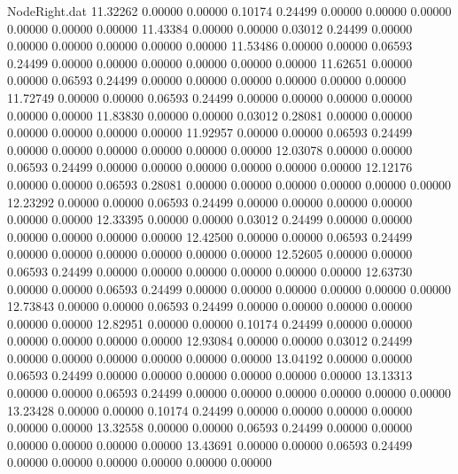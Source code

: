 \begin{filecontents}{NodeRight.dat}
  11.32262    0.00000    0.00000     0.10174    0.24499    0.00000    0.00000    0.00000    0.00000    0.00000    0.00000
  11.43384    0.00000    0.00000     0.03012    0.24499    0.00000    0.00000    0.00000    0.00000    0.00000    0.00000
  11.53486    0.00000    0.00000     0.06593    0.24499    0.00000    0.00000    0.00000    0.00000    0.00000    0.00000
  11.62651    0.00000    0.00000     0.06593    0.24499    0.00000    0.00000    0.00000    0.00000    0.00000    0.00000
  11.72749    0.00000    0.00000     0.06593    0.24499    0.00000    0.00000    0.00000    0.00000    0.00000    0.00000
  11.83830    0.00000    0.00000     0.03012    0.28081    0.00000    0.00000    0.00000    0.00000    0.00000    0.00000
  11.92957    0.00000    0.00000     0.06593    0.24499    0.00000    0.00000    0.00000    0.00000    0.00000    0.00000
  12.03078    0.00000    0.00000     0.06593    0.24499    0.00000    0.00000    0.00000    0.00000    0.00000    0.00000
  12.12176    0.00000    0.00000     0.06593    0.28081    0.00000    0.00000    0.00000    0.00000    0.00000    0.00000
  12.23292    0.00000    0.00000     0.06593    0.24499    0.00000    0.00000    0.00000    0.00000    0.00000    0.00000
  12.33395    0.00000    0.00000     0.03012    0.24499    0.00000    0.00000    0.00000    0.00000    0.00000    0.00000
  12.42500    0.00000    0.00000     0.06593    0.24499    0.00000    0.00000    0.00000    0.00000    0.00000    0.00000
  12.52605    0.00000    0.00000     0.06593    0.24499    0.00000    0.00000    0.00000    0.00000    0.00000    0.00000
  12.63730    0.00000    0.00000     0.06593    0.24499    0.00000    0.00000    0.00000    0.00000    0.00000    0.00000
  12.73843    0.00000    0.00000     0.06593    0.24499    0.00000    0.00000    0.00000    0.00000    0.00000    0.00000
  12.82951    0.00000    0.00000     0.10174    0.24499    0.00000    0.00000    0.00000    0.00000    0.00000    0.00000
  12.93084    0.00000    0.00000     0.03012    0.24499    0.00000    0.00000    0.00000    0.00000    0.00000    0.00000
  13.04192    0.00000    0.00000     0.06593    0.24499    0.00000    0.00000    0.00000    0.00000    0.00000    0.00000
  13.13313    0.00000    0.00000     0.06593    0.24499    0.00000    0.00000    0.00000    0.00000    0.00000    0.00000
  13.23428    0.00000    0.00000     0.10174    0.24499    0.00000    0.00000    0.00000    0.00000    0.00000    0.00000
  13.32558    0.00000    0.00000     0.06593    0.24499    0.00000    0.00000    0.00000    0.00000    0.00000    0.00000
  13.43691    0.00000    0.00000     0.06593    0.24499    0.00000    0.00000    0.00000    0.00000    0.00000    0.00000

\end{filecontents}
